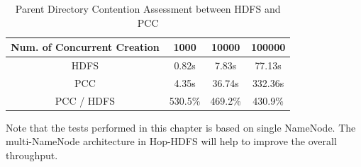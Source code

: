 \begin{table}[h]
	\centering
	\begin{tabular}{|c|c|c|c|}
		\hline
		\textbf{Num. of Concurrent Creation} & \textbf{1000} & \textbf{10000} & \textbf{100000} \\ \hline
		HDFS                                 & 0.82s         & 7.83s          & 77.13s          \\ \hline
		PCC                       & 4.35s         & 36.74s         & 332.36s         \\ \hline
		PCC / HDFS                           & 530.5\%       & 469.2\%        & 430.9\%         \\ \hline
	\end{tabular}
		\caption{Parent Directory Contention Assessment between HDFS and PCC}
		\label{table:hdfsPCCparent}
\end{table}

\noindent Note that the tests performed in this chapter is based on single NameNode. The multi-NameNode architecture in Hop-HDFS will help to improve the overall throughput.